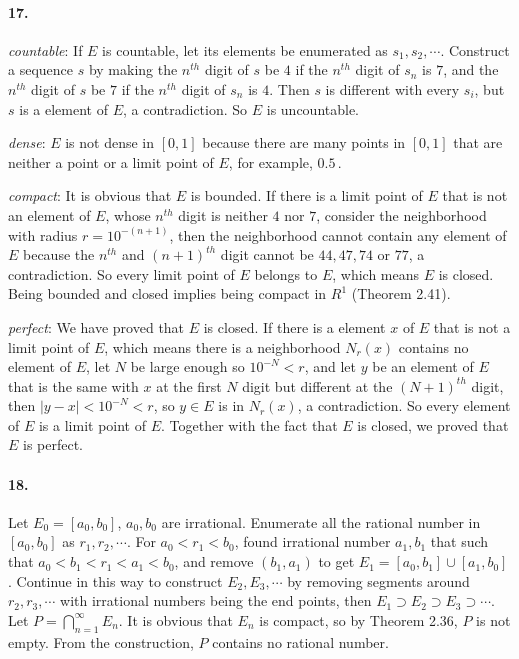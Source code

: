 \documentclass[a4paper]{article}
\begin{document}
\paragraph{17.}
\quad

\textit{countable}: If $E$ is countable, let its elements be enumerated as $s_1,s_2,\cdots$. Construct a sequence $s$ by making the $n^{th}$ digit of $s$ be $4$ if the $n^{th}$ digit of $s_n$ is $7$, and the $n^{th}$ digit of $s$ be $7$ if the $n^{th}$ digit of $s_n$ is $4$. Then $s$ is different with every $s_i$, but $s$ is a element of $E$, a contradiction. So $E$ is uncountable.

\textit{dense}: $E$ is not dense in $[0,1]$ because there are many points in $[0,1]$ that are neither a point or a limit point of $E$, for example, $0.5$\,.

\textit{compact}: It is obvious that $E$ is bounded. If there is a limit point of $E$ that is not an element of $E$, whose $n^{th}$ digit is neither $4$ nor $7$, consider the neighborhood with radius $r=10^{-(n+1)}$, then the neighborhood cannot contain any element of $E$ because the $n^{th}$ and $(n+1)^{th}$ digit cannot be $44,47,74$ or $77$, a contradiction. So every limit point of $E$ belongs to $E$, which means $E$ is closed. Being bounded and closed implies being compact in $R^1$ (Theorem 2.41).

\textit{perfect}: We have proved that $E$ is closed. If there is a element $x$ of $E$ that is not a limit point of $E$, which means there is a neighborhood $N_r(x)$ contains no element of $E$, let $N$ be large enough so $10^{-N}<r$, and let $y$ be an element of $E$ that is the same with $x$ at the first $N$ digit but different at the $(N+1)^{th}$ digit, then $|y-x|<10^{-N}<r$, so $y\in E$ is in $N_r(x)$, a contradiction. So every element of $E$ is a limit point of $E$. Together with the fact that $E$ is closed, we proved that $E$ is perfect.

\paragraph{18.}
Let $E_0=[a_0,b_0]$, $a_0,b_0$ are irrational. Enumerate all the rational number in $[a_0,b_0]$ as $r_1,r_2,\cdots$. For $a_0<r_1<b_0$, found irrational number $a_1,b_1$ that such that $a_0<b_1<r_1<a_1<b_0$, and remove $(b_1,a_1)$ to get $E_1=[a_0,b_1]\cup[a_1,b_0]$. Continue in this way to construct $E_2,E_3,\cdots$ by removing segments around $r_2,r_3,\cdots$ with irrational numbers being the end points, then $E_1\supset E_2\supset E_3\supset\cdots$. Let $P=\bigcap_{n=1}^\infty E_n$. It is obvious that $E_n$ is compact, so by Theorem 2.36, $P$ is not empty. From the construction, $P$ contains no rational number. 
\end{document}

